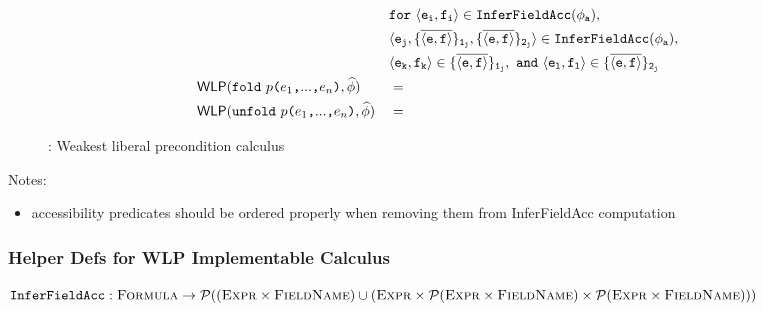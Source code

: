 \documentclass {llncs}
\begin{document}
\begin{figure}[ht!]
\begin{scenter}
\begin{alignat*}{2}
            &&& \mathtt{for~ \langle e_i, f_i \rangle \in InferFieldAcc(\phi_a),} \\
            &&& \mathtt{\langle e_j, \{\overline{\langle e, f \rangle}\}_{1_j}, \{\overline{\langle e, f \rangle}\}_{2_j} \rangle \in InferFieldAcc(\phi_a),}  \\ 
            &&& \mathtt{\langle e_k, f_k \rangle \in \{\overline{\langle e, f \rangle}\}_{1_j}, ~and~ \langle e_l, f_l \rangle \in \{\overline{\langle e, f \rangle}\}_{2_j}} \\ 
            &\textup{\textmd{\textsf{WLP}}}(\textup{\texttt{fold}}~{\textup{\texttt{$p$($e_1$,$...$,$e_n$)}}}, \widehat{\phi})
            &&= \\
            &\textup{\textmd{\textsf{WLP}}}(\textup{\texttt{unfold}}~{\textup{\texttt{$p$($e_1$,$...$,$e_n$)}}}, \widehat{\phi})
            &&=\\
        \end{alignat*}
    \end{scenter}
	\caption{\svlrp: Weakest liberal precondition calculus}
	\label{fig:svlrp-wlp-algo}
\end{figure}

Notes:
\begin{itemize}
\item accessibility predicates should be ordered properly when removing them from InferFieldAcc computation
\end{itemize}

\clearpage 

\subsubsection{Helper Defs for WLP Implementable Calculus} \hspace{0.3cm}

\noindent $\texttt{InferFieldAcc}: \textup{\textsc{Formula}} \rightarrow \mathcal{P}((\textup{\textsc{Expr}} \times \textup{\textsc{FieldName}}) \cup (\textup{\textsc{Expr}} \times \mathcal{P}(\textup{\textsc{Expr}} \times \textup{\textsc{FieldName}}) \times \mathcal{P}(\textup{\textsc{Expr}} \times \textup{\textsc{FieldName}})))$
\end{document}
